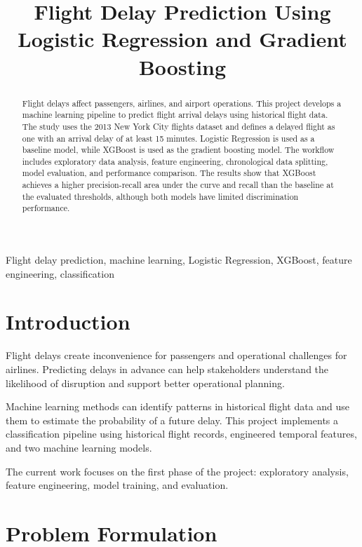 \documentclass[conference]{IEEEtran}
\title{Flight Delay Prediction Using Logistic Regression and Gradient Boosting}
\author{
\IEEEauthorblockN{Atharva Tiwari}
\IEEEauthorblockA{
Flight Delay Prediction Project\\
India
}
}
\begin{document}
\maketitle

\begin{abstract}
Flight delays affect passengers, airlines, and airport operations.
This project develops a machine learning pipeline to predict flight
arrival delays using historical flight data. The study uses the
2013 New York City flights dataset and defines a delayed flight as
one with an arrival delay of at least 15 minutes. Logistic Regression
is used as a baseline model, while XGBoost is used as the gradient
boosting model. The workflow includes exploratory data analysis,
feature engineering, chronological data splitting, model evaluation,
and performance comparison. The results show that XGBoost achieves
a higher precision-recall area under the curve and recall than the
baseline at the evaluated thresholds, although both models have
limited discrimination performance.
\end{abstract}

\begin{IEEEkeywords}
Flight delay prediction, machine learning, Logistic Regression,
XGBoost, feature engineering, classification
\end{IEEEkeywords}

\section{Introduction}

Flight delays create inconvenience for passengers and operational
challenges for airlines. Predicting delays in advance can help
stakeholders understand the likelihood of disruption and support
better operational planning.

Machine learning methods can identify patterns in historical flight
data and use them to estimate the probability of a future delay.
This project implements a classification pipeline using historical
flight records, engineered temporal features, and two machine learning
models.

The current work focuses on the first phase of the project:
exploratory analysis, feature engineering, model training, and
evaluation.

\section{Problem Formulation}
\end{document}
